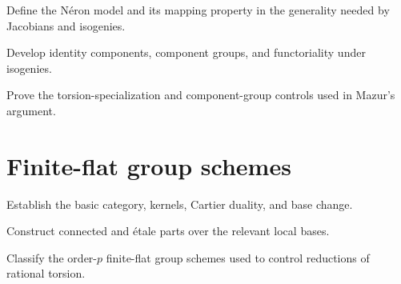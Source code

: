 \begin{milestone}\label{node:MT-NERON-BASE}
Define the N\'eron model and its mapping property in the generality needed by
Jacobians and isogenies.
\leanpending
\end{milestone}

\begin{milestone}\label{node:MT-NERON-COMPONENTS}
Develop identity components, component groups, and functoriality under
isogenies.
\leanpending
\end{milestone}

\begin{theorem}\label{node:MT-NERON-SPECIALIZATION}
Prove the torsion-specialization and component-group controls used in Mazur's
argument.
\leanpending
\end{theorem}

\section{Finite-flat group schemes}

\begin{milestone}\label{node:MT-FFGS-BASIC}
Establish the basic category, kernels, Cartier duality, and base change.
\leanpending
\end{milestone}

\begin{milestone}\label{node:MT-FFGS-CONNECTED-ETALE}
Construct connected and \'etale parts over the relevant local bases.
\leanpending
\end{milestone}

\begin{theorem}\label{node:MT-FFGS-OORT-RAYNAUD}
Classify the order-\(p\) finite-flat group schemes used to control reductions
of rational torsion.
\leanpending
\end{theorem}

